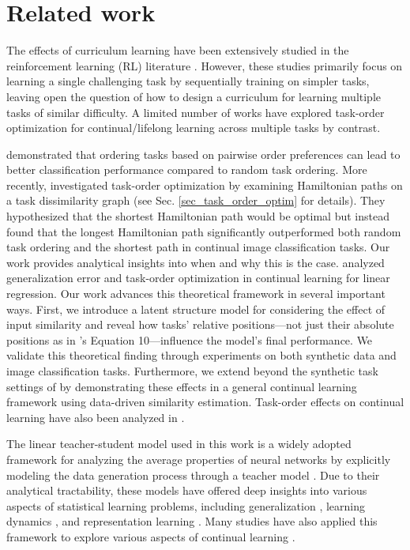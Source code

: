 \section{Related work}
The effects of curriculum learning have been extensively studied in the reinforcement learning (RL) literature \citep{elman1993learning, krueger2009flexible, narvekar2020curriculum}. However, these studies primarily focus on learning a single challenging task by sequentially training on simpler tasks, leaving open the question of how to design a curriculum for learning multiple tasks of similar difficulty. A limited number of works have explored task-order optimization for continual/lifelong learning across multiple tasks by contrast.

\citet{lad2009toward} demonstrated that ordering tasks based on pairwise order preferences can lead to better classification performance compared to random task ordering. More recently, \citet{bell2022effect} investigated task-order optimization by examining Hamiltonian paths on a task dissimilarity graph (see Sec. \ref{sec_task_order_optim} for details). They hypothesized that the shortest Hamiltonian path would be optimal but instead found that the longest Hamiltonian path significantly outperformed both random task ordering and the shortest path in continual image classification tasks. Our work provides analytical insights into when and why this is the case.
\citet{lin2023theory} analyzed generalization error and task-order optimization in continual learning for linear regression. Our work advances this theoretical framework in several important ways. First, we introduce a latent structure model for considering the effect of input similarity and reveal how tasks' relative positions—not just their absolute positions as in \citet{lin2023theory}'s Equation 10—influence the model's final performance. We validate this theoretical finding through experiments on both synthetic data and image classification tasks. Furthermore, we extend beyond the synthetic task settings of \citet{lin2023theory} by demonstrating these effects in a general continual learning framework using data-driven similarity estimation.
Task-order effects on continual learning have also been analyzed in \citep{pentina2015curriculum, evron2023continual, singh2023learning}.


The linear teacher-student model used in this work is a widely adopted framework for analyzing the average properties of neural networks by explicitly modeling the data generation process through a teacher model \citep{gardner1989three, zdeborova2016statistical, bahri2020statistical}. Due to their analytical tractability, these models have offered deep insights into various aspects of statistical learning problems, including generalization \citep{seung1992statistical, advani2020high}, learning dynamics \citep{saad1995line, werfel2003learning, saxe2013exact}, and representation learning \citep{saxe2019mathematical, tian2021understanding}. Many studies have also applied this framework to explore various aspects of continual learning \citep{asanuma2021statistical, lee2021continual, evron2022catastrophic, goldfarb2023analysis, li2023statistical, lin2023theory, evron2024joint, hiratani2024disentangling, mori2024optimal}.

